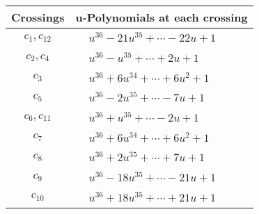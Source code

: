 \documentclass[1p]{elsarticle_modified}
\theoremstyle{definition}
\begin{document}
\begin{tabular}{m{50pt}|m{274pt}}
Crossings & \hspace{64pt}u-Polynomials at each crossing \\
\hline $$\begin{aligned}c_{1},c_{12}\end{aligned}$$&$\begin{aligned}
&u^{36}-21 u^{35}+\cdots-22 u+1
\end{aligned}$\\
\hline $$\begin{aligned}c_{2},c_{4}\end{aligned}$$&$\begin{aligned}
&u^{36}- u^{35}+\cdots+2 u+1
\end{aligned}$\\
\hline $$\begin{aligned}c_{3}\end{aligned}$$&$\begin{aligned}
&u^{36}+6 u^{34}+\cdots+6 u^2+1
\end{aligned}$\\
\hline $$\begin{aligned}c_{5}\end{aligned}$$&$\begin{aligned}
&u^{36}-2 u^{35}+\cdots-7 u+1
\end{aligned}$\\
\hline $$\begin{aligned}c_{6},c_{11}\end{aligned}$$&$\begin{aligned}
&u^{36}+u^{35}+\cdots-2 u+1
\end{aligned}$\\
\hline $$\begin{aligned}c_{7}\end{aligned}$$&$\begin{aligned}
&u^{36}+6 u^{34}+\cdots+6 u^2+1
\end{aligned}$\\
\hline $$\begin{aligned}c_{8}\end{aligned}$$&$\begin{aligned}
&u^{36}+2 u^{35}+\cdots+7 u+1
\end{aligned}$\\
\hline $$\begin{aligned}c_{9}\end{aligned}$$&$\begin{aligned}
&u^{36}-18 u^{35}+\cdots-21 u+1
\end{aligned}$\\
\hline $$\begin{aligned}c_{10}\end{aligned}$$&$\begin{aligned}
&u^{36}+18 u^{35}+\cdots+21 u+1
\end{aligned}$\\
\hline
\end{tabular}\\~\\
\end{document}
